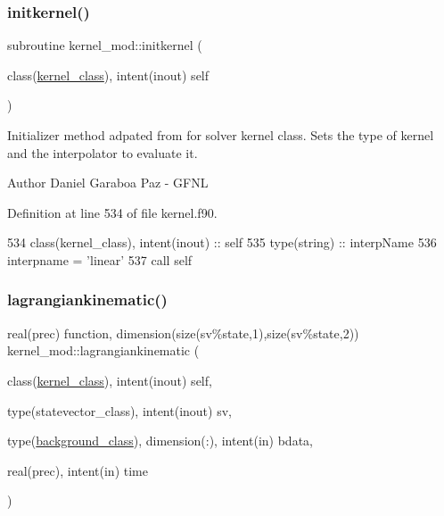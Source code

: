 \subsubsection{\texorpdfstring{initkernel()}{initkernel()}}
{\footnotesize\ttfamily subroutine kernel\+\_\+mod\+::initkernel (\begin{DoxyParamCaption}\item[{class(\mbox{\hyperlink{structkernel__mod_1_1kernel__class}{kernel\+\_\+class}}), intent(inout)}]{self }\end{DoxyParamCaption})}



Initializer method adpated from for solver kernel class. Sets the type of kernel and the interpolator to evaluate it. 

\begin{DoxyAuthor}{Author}
Daniel Garaboa Paz -\/ G\+F\+NL 
\end{DoxyAuthor}


Definition at line 534 of file kernel.\+f90.


\begin{DoxyCode}
534     \textcolor{keywordtype}{class}(kernel\_class), \textcolor{keywordtype}{intent(inout)} :: self
535     \textcolor{keywordtype}{type}(string) :: interpName
536     interpname = \textcolor{stringliteral}{'linear'}
537     \textcolor{keyword}{call }self%
\end{DoxyCode}
\mbox{\label{namespacekernel__mod_a7a181eab538ac32b3bddcf4bb34503bd}} 
\subsubsection{\texorpdfstring{lagrangiankinematic()}{lagrangiankinematic()}}
{\footnotesize\ttfamily real(prec) function, dimension(size(sv\%state,1),size(sv\%state,2)) kernel\+\_\+mod\+::lagrangiankinematic (\begin{DoxyParamCaption}\item[{class(\mbox{\hyperlink{structkernel__mod_1_1kernel__class}{kernel\+\_\+class}}), intent(inout)}]{self,  }\item[{type(statevector\+\_\+class), intent(inout)}]{sv,  }\item[{type(\mbox{\hyperlink{structbackground__mod_1_1background__class}{background\+\_\+class}}), dimension(\+:), intent(in)}]{bdata,  }\item[{real(prec), intent(in)}]{time }\end{DoxyParamCaption})}



